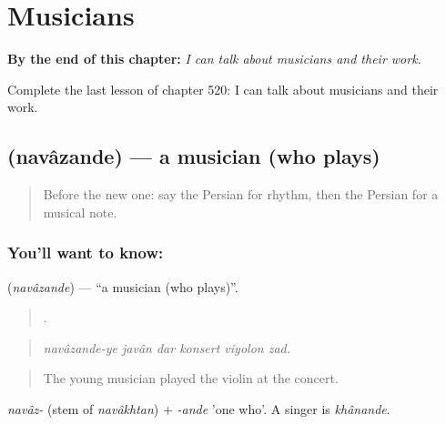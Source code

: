 
\chapter{Musicians}
\label{ch:fa-musicians}

\begin{chapteropening}
\textbf{By the end of this chapter:} \emph{I can talk about musicians and their work.}

Complete the last lesson of chapter 520: I can talk about musicians and their work.
\end{chapteropening}

\section[\texorpdfstring{\fa{نوازنده} (navâzande)}{نوازنده (navâzande)}]{ (navâzande) — a musician (who plays)}

\label{lesson:FA-C520-navazande}



\begin{quote}
Before the new one: say the Persian for rhythm, then the Persian for a musical note.
\end{quote}

\subsection*{You'll want to know: }
\textbf{} (\emph{navâzande}) — \textquotedblleft{}a musician (who plays)\textquotedblright{}.

\begin{quote}
     .
\end{quote}

\begin{quote}
\emph{navâzande-ye javân dar konsert viyolon zad.}
\end{quote}

\begin{quote}
The young musician played the violin at the concert.
\end{quote}

\emph{navâz-} (stem of \emph{navâkhtan}) + \emph{-ande} 'one who'. A singer is \emph{khânande}.

